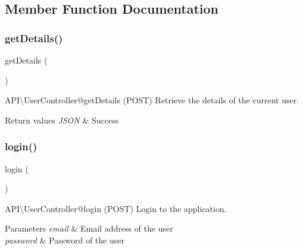 \subsection{Member Function Documentation}
\mbox{\label{class_app_1_1_http_1_1_controllers_1_1_a_p_i_1_1_user_controller_a67bcdf2ca053bbc348983454239ea980}} 
\subsubsection{\texorpdfstring{getDetails()}{getDetails()}}
{\footnotesize\ttfamily get\+Details (\begin{DoxyParamCaption}{ }\end{DoxyParamCaption})}

\begin{DoxyParagraph}{A\+PI\textbackslash{}\+User\+Controller@get\+Details (P\+O\+ST)}
Retrieve the details of the current user.
\end{DoxyParagraph}

\begin{DoxyRetVals}{Return values}
{\em J\+S\+ON} & Success \\
\hline
\end{DoxyRetVals}
\mbox{\label{class_app_1_1_http_1_1_controllers_1_1_a_p_i_1_1_user_controller_aa311da27ba5706f5710cea7706c8eae1}} 
\subsubsection{\texorpdfstring{login()}{login()}}
{\footnotesize\ttfamily login (\begin{DoxyParamCaption}{ }\end{DoxyParamCaption})}

\begin{DoxyParagraph}{A\+PI\textbackslash{}\+User\+Controller@login (P\+O\+ST)}
Login to the application.
\end{DoxyParagraph}

\begin{DoxyParams}{Parameters}
{\em email} & Email address of the user \\
\hline
{\em password} & Password of the user\\
\hline
\end{DoxyParams}

